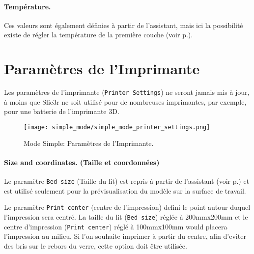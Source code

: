 \paragraph{Temp\'erature.} %
\label{par:temperature}
Ces valeurs sont \'egalement d\'efinies \`a partir de l'assistant, mais ici la possibilit\'e existe de r\'egler la temp\'erature de la premi\`ere couche (voir p.\pageref{sec:the_important_first_layer}).


\section{Param\`etres de l'Imprimante}

Les param\`etres de l'imprimante (\texttt{Printer Settings}) ne seront jamais mis \`a jour, \`a moins que Slic3r ne soit utilis\'e pour de nombreuses imprimantes, par exemple, pour une batterie de l'imprimante 3D.

\begin{figure}[H]
\centering
\texttt{[image: simple\_mode/simple\_mode\_printer\_settings.png]}
\caption{Mode Simple: Param\`etres de l'Imprimante.}
\label{fig:simple_mode_printer_settings}
\end{figure}

\paragraph{Size and coordinates. (Taille et coordonn\'ees)} %
\label{par:size_and_coordinates}
Le param\`etre \texttt{Bed size} (Taille du lit) est repris \`a partir de l'assistant (voir p.\pageref{sub:2_bed_size}) et est utilis\'e seulement pour la pr\'evisualisation du mod\`ele sur la surface de travail.

Le param\`etre \texttt{Print center} (centre de l'impression) defini le point autour duquel l'impression sera centr\'e.  La taille du lit (\texttt{Bed size}) r\'egl\'ee \`a 200mmx200mm et le centre d'impression (\texttt{Print center}) r\'egl\'e \`a 100mmx100mm would placera l'impression au milieu.  Si l'on souhaite imprimer \`a partir du centre, afin d'eviter des bris sur le rebors du verre, cette option doit \^etre utilis\'ee.

